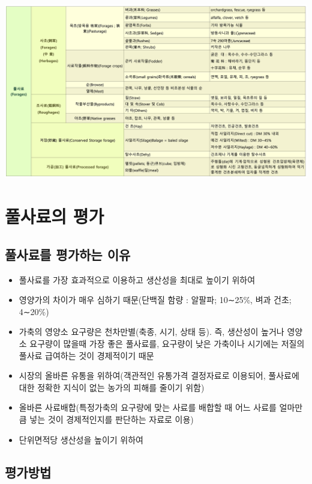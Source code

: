 \documentclass[]{book}
\providecommand{\tightlist}{%
  \setlength{\itemsep}{0pt}\setlength{\parskip}{0pt}}
\begin{document}
\includegraphics{figures/classification.png}

\section{풀사료의 평가}\label{-}

\subsection{풀사료를 평가하는 이유}\label{--}

\begin{itemize}
\tightlist
\item
  풀사료를 가장 효과적으로 이용하고 생산성을 최대로 높이기 위하여
\item
  영양가의 차이가 매우 심하기 때문(단백질 함량 : 알팔파; 10∼25\%, 벼과
  건초; 4∼20\%)
\item
  가축의 영양소 요구량은 천차만별(축종, 시기, 상태 등). 즉, 생산성이
  높거나 영양소 요구량이 많을때 가장 좋은 풀사료를, 요구량이 낮은
  가축이나 시기에는 저질의 풀사료 급여하는 것이 경제적이기 때문
\item
  시장의 올바른 유통을 위하여(객관적인 유통가격 결정자료로 이용되어,
  풀사료에 대한 정확한 지식이 없는 농가의 피해를 줄이기 위함)
\item
  올바른 사료배합(특정가축의 요구량에 맞는 사료를 배합할 때 어느 사료를
  얼마만큼 넣는 것이 경제적인지를 판단하는 자료로 이용)
\item
  단위면적당 생산성을 높이기 위하여
\end{itemize}

\subsection{평가방법}
\end{document}
